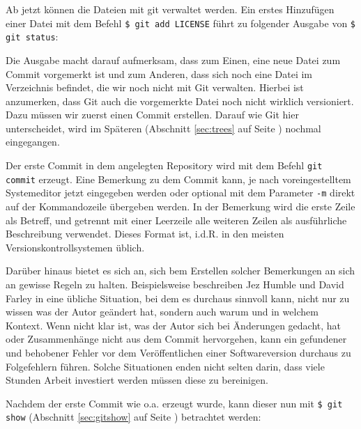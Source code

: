 

Ab jetzt können die Dateien mit \gls{git} verwaltet werden. Ein erstes
Hinzufügen einer Datei mit dem Befehl \texttt{\$ git add LICENSE} führt zu
folgender Ausgabe von \texttt{\$ git status}:



Die Ausgabe macht darauf aufmerksam, dass zum Einen, eine neue Datei zum Commit
vorgemerkt ist und zum Anderen, dass sich noch eine Datei im Verzeichnis
befindet, die wir noch nicht mit Git verwalten. Hierbei ist anzumerken, dass
Git auch die vorgemerkte Datei noch nicht wirklich versioniert. Dazu müssen wir
zuerst einen Commit erstellen. Darauf wie Git hier unterscheidet, wird im
Späteren (Abschnitt \ref{sec:trees} auf Seite \pageref{sec:trees}) nochmal
eingegangen.

Der erste Commit in dem angelegten Repository wird mit dem Befehl \texttt{git
commit} erzeugt. Eine Bemerkung zu dem Commit kann, je nach voreingestelltem
Systemeditor jetzt eingegeben werden oder optional mit dem Parameter \texttt{-m}
direkt auf der Kommandozeile übergeben werden. In der Bemerkung wird die erste
Zeile als Betreff, und getrennt mit einer Leerzeile alle weiteren Zeilen als
ausführliche Beschreibung verwendet. Dieses Format ist, i.d.R. in den meisten
Versionskontrollsystemen üblich.

Darüber hinaus bietet es sich an, sich bem Erstellen solcher Bemerkungen an sich
an gewisse Regeln zu halten. Beispielsweise beschreiben Jez Humble und David
Farley in \cite[S.~37]{cd} eine übliche Situation, bei dem es durchaus sinnvoll
kann, nicht nur zu wissen was der Autor geändert hat, sondern auch warum
und in welchem Kontext. Wenn nicht klar ist, was der Autor sich bei
Änderungen gedacht, hat oder Zusammenhänge nicht aus dem Commit hervorgehen, kann
ein gefundener und behobener Fehler vor dem Veröffentlichen einer
Softwareversion durchaus zu Folgefehlern führen. Solche Situationen enden
nicht selten darin, dass viele Stunden Arbeit investiert werden müssen diese zu
bereinigen.\cite[S.~37]{cd}

Nachdem der erste Commit wie o.a. erzeugt wurde, kann dieser nun mit \texttt{\$
git show} (Abschnitt \ref{sec:gitshow} auf Seite \pageref{git:show}) betrachtet
werden:

